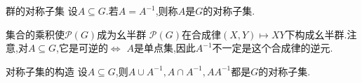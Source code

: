 \begin{definition}{群的对称子集}{}
	设$A\subseteq G$.若$A=A^{-1}$,则称$A$是$G$的对称子集.
\end{definition}

\begin{remark}{集合的乘积使$\mathcal{P}\left(G\right)$成为幺半群}{}
	$\mathcal{P}\left(G\right)$在合成律$\left(X,Y\right)\mapsto XY$下构成幺半群.注意,对$A\subseteq G$,它是可逆的$\iff$ $A$是单点集,因此$A^{-1}$不一定是这个合成律的逆元.
\end{remark}

\begin{proposition}{对称子集的构造}{}
	设$A\subseteq G$,则$A\cup A^{-1},A\cap A^{-1},AA^{-1}$都是$G$的对称子集.
\end{proposition}














